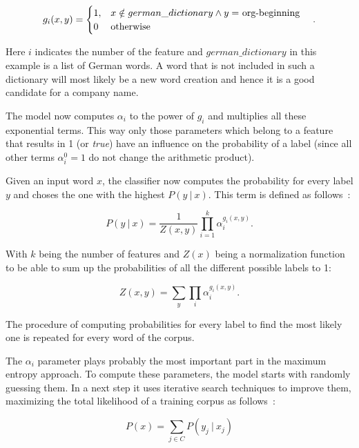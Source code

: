 		\begin{equation*}
		   g_i(x, y) =
		  \begin{cases}
		      1, & \parbox[t]{.6\textwidth}{
		        $x \notin german\_dictionary \wedge y =$ org-beginning
		      }\\
		      0 & \text{otherwise}
		  \end{cases}.
		\end{equation*}

		Here \(i\) indicates the number of the feature and \(german\_dictionary\) in this example is a list of German words. A word that is not included in such a dictionary will most likely be a new word creation and hence it is a good candidate for a company name.

		The model now computes $\alpha_i$ to the power of $g_i$ and multiplies all these exponential terms. This way only those parameters which belong to a feature that results in 1 (or \textit{true}) have an influence on the probability of a label (since all other terms $\alpha_i^0 = 1$ do not change the arithmetic product).

		Given an input word $x$, the classifier now computes the probability for every label $y$ and choses the one with the highest $P(y\ |\ x)$. This term is defined as follows~\cite{Chieu:2002:NER:1072228.1072253}:

		\begin{equation*}
		  P(y\ |\ x) = \frac{1}{Z(x, y)} \prod_{i = 1}^{k} \alpha_i^{g_i(x, y)}.
		\end{equation*}

		With \(k\) being the number of features and \(Z(x)\) being a normalization function to be able to sum up the probabilities of all the different possible labels to 1:

		\begin{equation*}
		  Z(x, y) = \sum_y \prod_i \alpha_i^{g_i(x, y)}.
		\end{equation*}

		The procedure of computing probabilities for every label to find the most likely one is repeated for every word of the corpus.

		The $\alpha_i$ parameter plays probably the most important part in the maximum entropy approach. To compute these parameters, the model starts with randomly guessing them. In a next step it uses iterative search techniques to improve them, maximizing the total likelihood of a training corpus as follows~\cite{nltkinfoextract}:

		\begin{equation*}
		  P(x) = \sum_{j \in C} P(y_j\ |\ x_j)
		\end{equation*}

